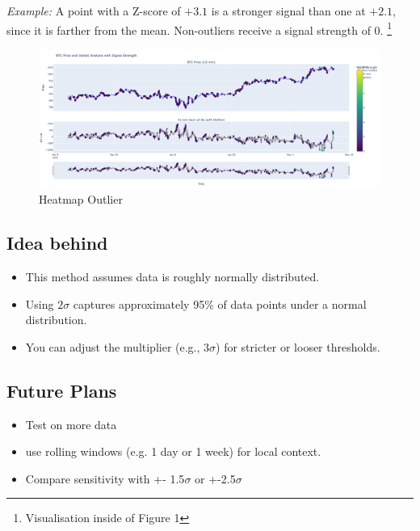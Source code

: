 \documentclass[12pt]{article}
\begin{document}
\textit{Example:}  
A point with a Z-score of $+3.1$ is a stronger signal than one at $+2.1$, since it is farther from the mean.  
Non-outliers receive a signal strength of 0. 
\footnote{Visualisation inside of Figure 1}





\begin{figure}
    \centering
    \includegraphics[width=1\textwidth]{imgs/outlier_signal_visualised.png}
    \caption{Heatmap Outlier}
\end{figure}




\newpage


\subsection*{Idea behind}

\begin{itemize}
    \item This method assumes data is roughly normally distributed.
    \item Using $2\sigma$ captures approximately 95\% of data points under a normal distribution.
    \item You can adjust the multiplier (e.g., $3\sigma$) for stricter or looser thresholds.
\end{itemize}





\subsection*{Future Plans}

\begin{itemize}
    \item Test on more data
    \item use rolling windows (e.g. 1 day or 1 week) for local context.
    \item Compare sensitivity with +- 1.5$\sigma$ or +-2.5$\sigma$
\end{itemize}
\end{document}
